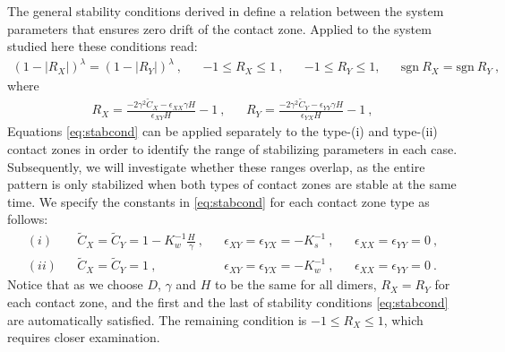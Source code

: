\documentclass[a4paper,10pt]{article}
\begin{document}
 The general stability conditions derived in \cite{Majka2023} define a relation between the system parameters that ensures zero drift of the contact zone. Applied to the system studied here these conditions read:
\begin{align}
(1-|R_X|)^{\lambda}=(1-|R_Y|)^{\lambda}~, && -1\le R_{X}\le 1~, && -1\le R_Y\le 1, &&\textrm{sgn}~R_X=\textrm{sgn}~R_Y~,\label{eq:stabcond}
\end{align}
where
\begin{align}
R_X=\frac{-2\gamma^2\tilde C_X  -\epsilon_{XX} \gamma H }{\epsilon_{XY} H}-1~, && R_Y=\frac{-2\gamma^2\tilde C_Y -\epsilon_{YY}\gamma H }{\epsilon_{YX} H}-1~,\label{eq:effparams}
\end{align}
Equations \eqref{eq:stabcond} can be applied separately to the type-(i) and type-(ii) contact zones in order to identify the range of stabilizing parameters in each case. Subsequently, we will investigate whether these ranges overlap, as the entire pattern is only stabilized when both types of contact zones are stable at the same time. We specify the constants in \eqref{eq:stabcond} for each contact zone type as follows:
\begin{align}
(i)&& \tilde C_{X}=\tilde C_Y=1-K_w^{-1}\frac{H}{\gamma}~, && \epsilon_{XY}=\epsilon_{YX}=-K_s^{-1}~, && \epsilon_{XX}=\epsilon_{YY}=0~, \label{eq:type(i)}\\
(ii)&& \tilde C_{X}=\tilde C_Y=1~, && \epsilon_{XY}=\epsilon_{YX}=-K_w^{-1}~, && \epsilon_{XX}=\epsilon_{YY}=0~.\label{eq:type(ii)}
\end{align}
Notice that as we choose $D$, $\gamma$ and $H$ to be the same for all dimers, $R_X=R_Y$ for each contact zone, and the first and the last of stability conditions \eqref{eq:stabcond} are automatically satisfied. The remaining condition is $-1\le R_{X}\le 1$, which requires closer examination. 
\end{document}
